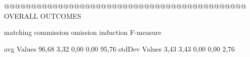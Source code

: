  @@@@@@@@@@@@@@@@@@@@@@@@@@@@@@@@@@@@@@@@@@@@@ OVERALL OUTCOMES

                matching commission   omission  induction   F-measure

avg Values      96,68       3,32       0,00       0,00       95,76        
stdDev Values    3,43       3,43       0,00       0,00        2,76        
